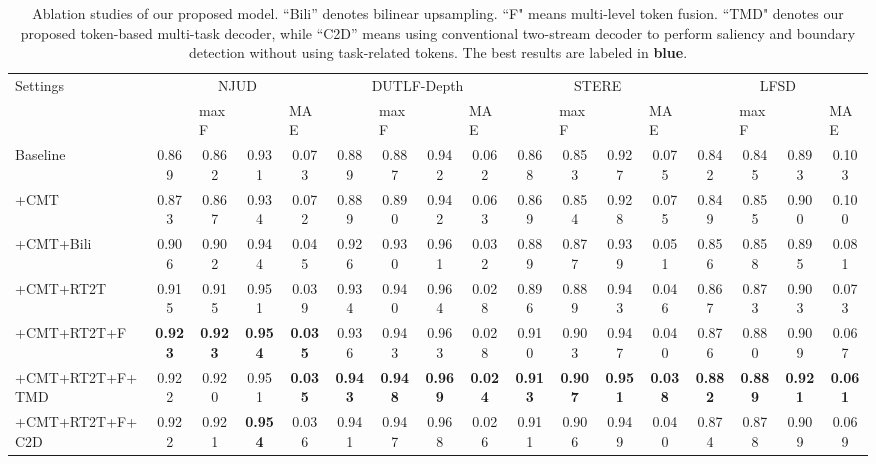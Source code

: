 \documentclass[10pt,twocolumn,letterpaper]{article}
\def\blu#1{\textbf{\color{blue} #1}} \def\red#1{\textbf{\color{red}\underline{#1}}}
\begin{document}
\begin{table*}[t]
\centering
\scriptsize
\renewcommand{\arraystretch}{1.0}
\renewcommand{\tabcolsep}{1.0mm}
\caption{Ablation studies of our proposed model. ``Bili'' denotes bilinear upsampling. ``F" means multi-level token fusion. ``TMD" denotes our proposed token-based multi-task decoder, while ``C2D'' means using conventional two-stream decoder to perform saliency and boundary detection without using task-related tokens. The best results are labeled in \blu{blue}.
}
\begin{tabular}{l|l|cccc|cccc|cccc|cccc}
\hline
\multicolumn{2}{l|}{\multirow{2}{*}{Settings}} & \multicolumn{4}{c|}{NJUD \cite{ju2014njud}} & \multicolumn{4}{c|}{DUTLF-Depth \cite{Piao2019dmra}} & \multicolumn{4}{c|}{STERE \cite{niu2012stere}} & \multicolumn{4}{c}{LFSD \cite{li2014lfsd}}\\
\multicolumn{2}{l|}{} & \multicolumn{1}{l}{} & \multicolumn{1}{l}{maxF } & \multicolumn{1}{l}{} & \multicolumn{1}{l|}{MAE }
                      & \multicolumn{1}{l}{} & \multicolumn{1}{l}{maxF } & \multicolumn{1}{l}{} & \multicolumn{1}{l|}{MAE }
                      & \multicolumn{1}{l}{} & \multicolumn{1}{l}{maxF } & \multicolumn{1}{l}{} & \multicolumn{1}{l|}{MAE }
                      & \multicolumn{1}{l}{} & \multicolumn{1}{l}{maxF } & \multicolumn{1}{l}{} & \multicolumn{1}{l}{MAE }
  \\ \hline

\multicolumn{2}{l|}{Baseline}       &0.869 &0.862 &0.931 &0.073   &0.889 &0.887 &0.942 &0.062   &0.868 &0.853 &0.927 &0.075   &0.842 &0.845 &0.893 &0.103\\ \hline
\multicolumn{2}{l|}{+CMT}           &0.873 &0.867 &0.934 &0.072   &0.889 &0.890 &0.942 &0.063   &0.869 &0.854 &0.928 &0.075   &0.849 &0.855 &0.900 &0.100\\ \hline
\multicolumn{2}{l|}{+CMT+Bili}      &0.906 &0.902 &0.944 &0.045   &0.926 &0.930 &0.961 &0.032   &0.889 &0.877 &0.939 &0.051   &0.856 &0.858 &0.895 &0.081\\
\multicolumn{2}{l|}{+CMT+RT2T}       &0.915 &0.915 &0.951 &0.039   &0.934 &0.940 &0.964 &0.028   &0.896 &0.889 &0.943 &0.046   &0.867 &0.873 &0.903 &0.073\\ \hline
\multicolumn{2}{l|}{+CMT+RT2T+F}    &\blu{0.923} &\blu{0.923} &\blu{0.954} &\blu{0.035}   &0.936 &0.943 &0.963 &0.028   &0.910 &0.903 &0.947 &0.040   &0.876 &0.880 &0.909 &0.067\\
\multicolumn{2}{l|}{+CMT+RT2T+F+TMD}  &0.922 &0.920 &0.951 &\blu{0.035}   &\blu{0.943} &\blu{0.948} &\blu{0.969} &\blu{0.024}   &\blu{0.913} &\blu{0.907} &\blu{0.951} &\blu{0.038}   &\blu{0.882} &\blu{0.889} &\blu{0.921} &\blu{0.061}\\ \hline
\multicolumn{2}{l|}{+CMT+RT2T+F+C2D}  &0.922 &0.921 &\blu{0.954} &0.036   &0.941 &0.947 &0.968 &0.026   &0.911 &0.906 &0.949 &0.040   &0.874 &0.878 &0.909 &0.069\\ \hline
\end{tabular}
\label{ablationTab}
\vspace{-3mm}
\end{table*}
\end{document}
